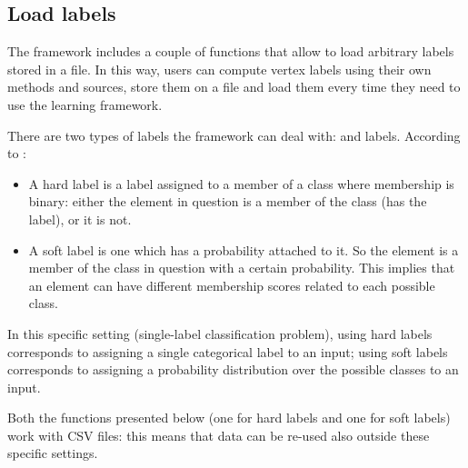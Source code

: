         \subsection{Load labels}
            The framework includes a couple of functions that allow to load arbitrary labels stored in a file. In this way, users can compute vertex labels using their own methods and sources, store them on a file and load them every time they need to use the learning framework.
            
            There are two types of labels the framework can deal with:  and  labels. According to \cite{Galstyan}:
            \begin{itemize}
                \item A hard label is a label assigned to a member of a class where membership is binary: either the element in question is a member of the class (has the label), or it is not.
                \item A soft label is one which has a probability attached to it. So the element is a member of the class in question with a certain probability. This implies that an element can have different membership scores related to each possible class.
            \end{itemize}
            In this specific setting (single-label classification problem), using hard labels corresponds to assigning a single categorical label to an input; using soft labels corresponds to assigning a probability distribution over the possible classes to an input.
            
            Both the functions presented below (one for hard labels and one for soft labels) work with CSV files: this means that data can be re-used also outside these specific settings.
            
